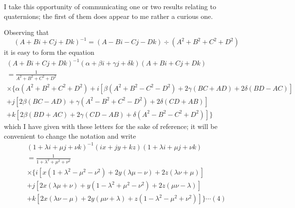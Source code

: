 \documentclass[11pt,a4paper]{book}
\begin{document}
I take this opportunity of communicating one or two results relating to quaternions;
the first of them does appear to me rather a curious one.

Observing that
\[
(A + Bi + Cj + Dk)^{-1} = (A - Bi - Cj - Dk) \div (A^2 + B^2 + C^2 + D^2)
\]
it is easy to form the equation
\begin{multline*}
(A + Bi + Cj + Dk)^{-1} (\alpha + \beta i + \gamma j + \delta k) (A + Bi + Cj + Dk)\\
= \frac{1}{A^2 + B^2 + C^2 + D^2}\\
\times \{\alpha(A^2+B^2+C^2+D^2) + i[\beta(A^2+B^2-C^2-D^2) + 2\gamma(BC+AD) + 2\delta(BD-AC)]\\
+ j[2\beta(BC-AD) + \gamma(A^2-B^2+C^2-D^2) + 2\delta(CD+AB)]\\
+ k[2\beta(BD+AC) + 2\gamma(CD-AB) + \delta(A^2-B^2-C^2+D^2)]\}
\end{multline*}
which I have given with these letters for the sake of reference; it will be convenient
to change the notation and write
\begin{multline*}
(1 + \lambda i + \mu j + \nu k)^{-1} (ix + jy + kz) (1 + \lambda i + \mu j + \nu k)\\
= \frac{1}{1 + \lambda^2 + \mu^2 + \nu^2}\\
\times \{i[x(1+\lambda^2-\mu^2-\nu^2) + 2y(\lambda\mu-\nu) + 2z(\lambda\nu+\mu)]\\
+ j[2x(\lambda\mu+\nu) + y(1-\lambda^2+\mu^2-\nu^2) + 2z(\mu\nu-\lambda)]\\
+ k[2x(\lambda\nu-\mu) + 2y(\mu\nu+\lambda) + z(1-\lambda^2-\mu^2+\nu^2)]\} \cdots (4)
\end{multline*}

\newpage
\setcounter{page}{124}
\end{document}
